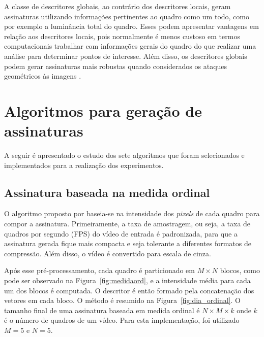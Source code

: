    A classe de descritores globais, ao contrário dos descritores locais, geram assinaturas utilizando informações pertinentes ao quadro como um todo, como por exemplo a luminância total do quadro. Esses podem apresentar vantagens em relação aos descritores locais, pois normalmente é menos custoso em termos computacionais trabalhar com informações gerais do quadro do que realizar uma análise para determinar pontos de interesse. Além disso, os descritores globais podem gerar assinaturas mais robustas quando considerados os ataques geométricos às imagens \cite{law2007video}. 
    
\section{Algoritmos para geração de assinaturas}

	
	A seguir é apresentado o estudo dos sete algoritmos que foram selecionados e implementados para a realização dos experimentos.


%
%
\subsection{Assinatura baseada na medida ordinal}
\label{sec:med_ordinal}

	O algoritmo proposto por  baseia-se na intensidade dos \textit{pixels} de cada quadro para compor a assinatura. Primeiramente, a taxa de amostragem, ou seja, a taxa de quadros por segundo (FPS) do vídeo de entrada é padronizada, para que a assinatura gerada fique mais compacta e seja tolerante a diferentes formatos de compressão. Além disso, o vídeo é convertido para escala de cinza.

	Após esse pré-processamento, cada quadro é particionado em $M \times N$ blocos, como pode ser observado na Figura~\ref{fig:medidaord}, e a intensidade média para cada um dos blocos é computada. O descritor é então formado pela concatenação dos vetores em cada bloco. O método é resumido na Figura~\ref{fig:dia_ordinal}. O tamanho final de uma assinatura baseada em medida ordinal é $N \times M \times k$ onde $k$ é o número de quadros de um vídeo. Para esta implementação, foi utilizado $M = 5$ e $N = 5$.

